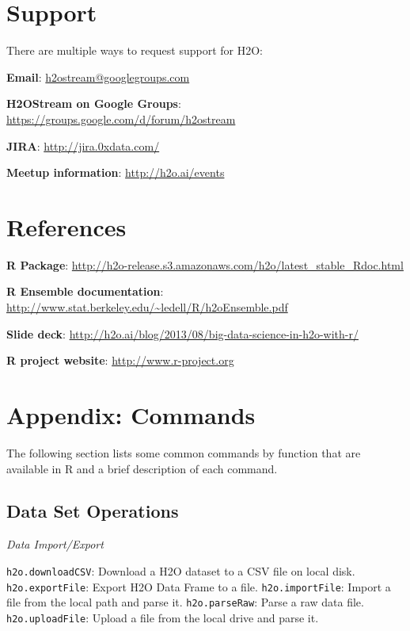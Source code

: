 \section{Support}
There are multiple ways to request support for H2O: \bigskip

{\textbf{Email}}: {\url{h2ostream@googlegroups.com}}

{\textbf{H2OStream on Google Groups}}: {\url{https://groups.google.com/d/forum/h2ostream}} 

{\textbf{JIRA}}: {\url{http://jira.0xdata.com/}}

{\textbf{Meetup information}}: {\url{http://h2o.ai/events}}

\section{References}\bigskip

{\bfseries{R Package}}:  \url{http://h2o-release.s3.amazonaws.com/h2o/latest_stable_Rdoc.html}

{\bfseries{R Ensemble documentation}}: \url{http://www.stat.berkeley.edu/~ledell/R/h2oEnsemble.pdf} 

{\bfseries{Slide deck}}: \url{http://h2o.ai/blog/2013/08/big-data-science-in-h2o-with-r/} 

{\bfseries{R project website}}: \url{http://www.r-project.org} 

\newpage
\section{Appendix: Commands} \label{Appendix} 

The following section lists some common commands by function that are available in R and a brief description of each command. 
\subsection {Data Set Operations}
{\emph{Data Import/Export}}\par
{\texttt{h2o.downloadCSV}}: Download a H2O dataset to a CSV file on local disk.\newline
{\texttt{h2o.exportFile}}: Export H2O Data Frame to a file.\newline
{\texttt{h2o.importFile}}: Import a file from the local path and parse it.\newline
{\texttt{h2o.parseRaw}}: Parse a raw data file. \newline
{\texttt{h2o.uploadFile}}: Upload a file from the local drive and parse it.\newline

